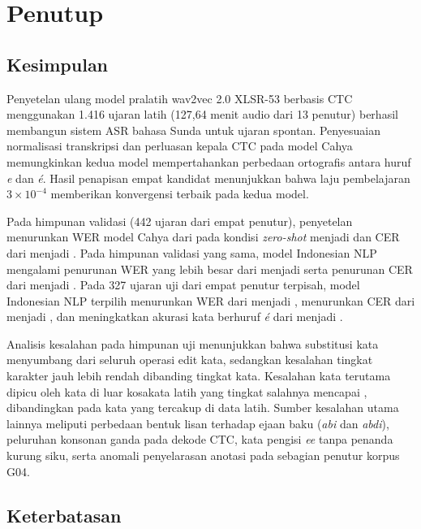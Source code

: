 \chapter{Penutup}
\label{bab:penutup}

\section{Kesimpulan}

Penyetelan ulang model pralatih wav2vec 2.0 XLSR-53 berbasis CTC menggunakan 1.416 ujaran latih (127,64 menit audio dari 13 penutur) berhasil membangun sistem ASR bahasa Sunda untuk ujaran spontan. Penyesuaian normalisasi transkripsi  dan perluasan kepala CTC pada model Cahya memungkinkan kedua model mempertahankan perbedaan ortografis antara huruf \textit{e} dan \textit{é}. Hasil penapisan empat kandidat menunjukkan bahwa laju pembelajaran \(3 \times 10^{-4}\) memberikan konvergensi terbaik pada kedua model.

Pada himpunan validasi (442 ujaran dari empat penutur), penyetelan menurunkan WER model Cahya dari  pada kondisi \textit{zero-shot} menjadi  dan CER dari  menjadi . Pada himpunan validasi yang sama, model Indonesian NLP mengalami penurunan WER yang lebih besar dari  menjadi  serta penurunan CER dari  menjadi . Pada 327 ujaran uji dari empat penutur terpisah, model Indonesian NLP terpilih menurunkan WER dari  menjadi , menurunkan CER dari  menjadi , dan meningkatkan akurasi kata berhuruf \textit{é} dari  menjadi .

Analisis kesalahan pada himpunan uji menunjukkan bahwa substitusi kata menyumbang  dari seluruh operasi edit kata, sedangkan kesalahan tingkat karakter jauh lebih rendah dibanding tingkat kata. Kesalahan kata terutama dipicu oleh kata di luar kosakata latih yang tingkat salahnya mencapai , dibandingkan  pada kata yang tercakup di data latih. Sumber kesalahan utama lainnya meliputi perbedaan bentuk lisan terhadap ejaan baku (\textit{abi} dan \textit{abdi}), peluruhan konsonan ganda pada dekode CTC, kata pengisi \textit{ee} tanpa penanda kurung siku, serta anomali penyelarasan anotasi pada sebagian penutur korpus G04.

\section{Keterbatasan}

